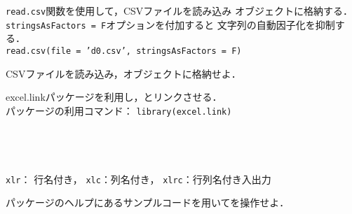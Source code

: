 {
  {
    \texttt{read.csv}関数を使用して，CSVファイルを読み込み
    オブジェクトに格納する．
  }
  \MyConsole
  {
    \\
  }
  \texttt{stringsAsFactors = F}オプションを付加すると
  文字列の自動因子化を抑制する．\\
  \texttt{read.csv(file = 'd0.csv', stringsAsFactors = F)}
}

{
  \MyExercise
  {
    CSVファイルを読み込み，オブジェクトに格納せよ．
  }
}

{
  {
    excel.linkパッケージを利用し，\R とリンクさせる．\\
    パッケージの利用コマンド： \texttt{library(excel.link)}
  }
  \MyConsole
  {
    \\
    \hfill {}\\
    \\
    \hfill {}\\
    \hfill {}\\
    \hfill {}
  }
  \vspace{-2mm}
  \texttt{xlr}： 行名付き，
  \texttt{xlc}：列名付き，
  \texttt{xlrc}：行列名付き入出力
}

{
  \MyExercise
  {
    パッケージのヘルプにあるサンプルコードを用いて\Excel を操作せよ．
  }
}


